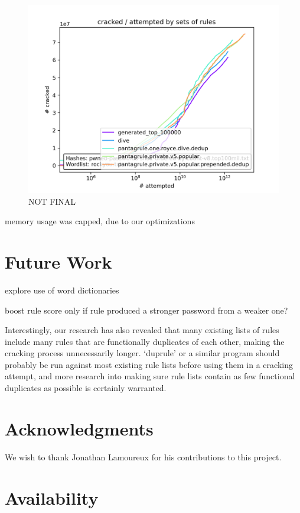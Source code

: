 \documentclass[letterpaper,twocolumn,10pt]{article}
\begin{document}
\begin{figure}
    \includegraphics[width=\linewidth]
    {../cracked_attempted_plot_08318a9a-a503-11ed-9d73-005056c00001.png}
    \caption{NOT FINAL}
    \label{fig:cracked-attempted}
\end{figure}

memory usage was capped, due to our optimizations

\section{Future Work}

explore use of word dictionaries

boost rule score only if rule produced a stronger password from a weaker one?

Interestingly, our research has also revealed that many existing lists of rules
include many rules that are functionally duplicates of each other, making the
cracking process unnecessarily longer. `duprule' or a similar program should
probably be run against most existing rule lists before using them in a cracking
attempt, and more research into making sure rule lists contain as few functional
duplicates as possible is certainly warranted.

\section*{Acknowledgments}

We wish to thank Jonathan Lamoureux for his contributions to this project.

\section*{Availability}
\end{document}
